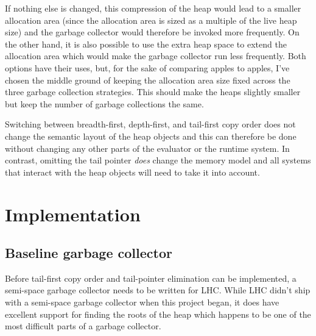 \documentclass[a4paper,oneside]{memoir}
\begin{document}
If nothing else is changed, this compression of the heap would lead to a smaller
allocation area (since the allocation area is sized as a multiple of the live heap
size)
and the garbage collector would therefore be invoked more frequently. On the other
hand, it is also possible to use the extra heap space to extend the allocation area
which would make the garbage collector run less frequently. Both options have
their uses, but, for the sake of comparing apples to apples, I've chosen the
middle ground of keeping the allocation area size fixed across the three garbage
collection strategies. This should make the heaps slightly smaller but keep the
number of garbage collections the same.

Switching between breadth-first, depth-first, and tail-first copy order does not
change the semantic layout of the heap objects and this can therefore be done
without changing any other parts of the evaluator or the runtime system. In
contrast, omitting the tail pointer \emph{does} change the memory model and
all systems that interact with the heap objects will need to take it into
account.



\section{Implementation}

\subsection{Baseline garbage collector}\label{algorithm}

Before tail-first copy order and tail-pointer elimination can be implemented,
a semi-space garbage collector needs to be written for LHC. While LHC didn't
ship with a semi-space garbage collector when this project began, it does have
excellent support for finding the roots of the heap which happens to be one of
the most difficult parts of a garbage collector.
\end{document}
